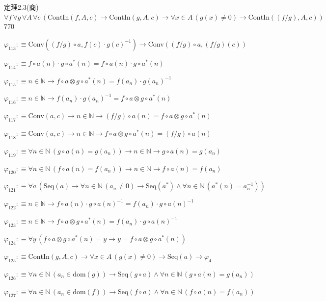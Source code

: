 \begin{fullproof}{定理2.3(商)}{$\forall f\,\forall g\,\forall A\,\forall c\,(\mathrm{ContIn}(f,A,c) \to \mathrm{ContIn}(g,A,c) \to \forall x \in A\,(g(x) \neq 0) \to \mathrm{ContIn}((f / g),A,c))$}{770}
\begin{abbrevlist}
\item $\varphi_{113} :\equiv \mathrm{Conv}((f / g) \circ a,f(c) \cdot g(c)^{-1}) \to \mathrm{Conv}((f / g) \circ a,(f / g)(c))$
\item $\varphi_{114} :\equiv f \circ a(n) \cdot g \circ a^{\ast}(n) = f \circ a(n) \cdot g \circ a^{\ast}(n)$
\item $\varphi_{115} :\equiv n \in \mathbb{N} \to f \circ a \otimes g \circ a^{\ast}(n) = f(a_{n}) \cdot g(a_{n})^{-1}$
\item $\varphi_{116} :\equiv n \in \mathbb{N} \to f(a_{n}) \cdot g(a_{n})^{-1} = f \circ a \otimes g \circ a^{\ast}(n)$
\item $\varphi_{117} :\equiv \mathrm{Conv}(a,c) \to n \in \mathbb{N} \to (f / g) \circ a(n) = f \circ a \otimes g \circ a^{\ast}(n)$
\item $\varphi_{118} :\equiv \mathrm{Conv}(a,c) \to n \in \mathbb{N} \to f \circ a \otimes g \circ a^{\ast}(n) = (f / g) \circ a(n)$
\item $\varphi_{119} :\equiv \forall n \in \mathbb{N}\,(g \circ a(n) = g(a_{n})) \to n \in \mathbb{N} \to g \circ a(n) = g(a_{n})$
\item $\varphi_{120} :\equiv \forall n \in \mathbb{N}\,(f \circ a(n) = f(a_{n})) \to n \in \mathbb{N} \to f \circ a(n) = f(a_{n})$
\item $\varphi_{121} :\equiv \forall a\,(\mathrm{Seq}(a) \to \forall n \in \mathbb{N}\,(a_{n} \neq 0) \to \mathrm{Seq}(a^{\ast}) \land \forall n \in \mathbb{N}\,(a^{\ast}(n) = a_{n}^{-1}))$
\item $\varphi_{122} :\equiv n \in \mathbb{N} \to f \circ a(n) \cdot g \circ a(n)^{-1} = f(a_{n}) \cdot g \circ a(n)^{-1}$
\item $\varphi_{123} :\equiv n \in \mathbb{N} \to f \circ a \otimes g \circ a^{\ast}(n) = f(a_{n}) \cdot g \circ a(n)^{-1}$
\item $\varphi_{124} :\equiv \forall y\,(f \circ a \otimes g \circ a^{\ast}(n) = y \to y = f \circ a \otimes g \circ a^{\ast}(n))$
\item $\varphi_{125} :\equiv \mathrm{ContIn}(g,A,c) \to \forall x \in A\,(g(x) \neq 0) \to \mathrm{Seq}(a) \to \varphi_{4}$
\item $\varphi_{126} :\equiv \forall n \in \mathbb{N}\,(a_{n} \in \mathrm{dom}(g)) \to \mathrm{Seq}(g \circ a) \land \forall n \in \mathbb{N}\,(g \circ a(n) = g(a_{n}))$
\item $\varphi_{127} :\equiv \forall n \in \mathbb{N}\,(a_{n} \in \mathrm{dom}(f)) \to \mathrm{Seq}(f \circ a) \land \forall n \in \mathbb{N}\,(f \circ a(n) = f(a_{n}))$

\end{abbrevlist}
\end{fullproof}

